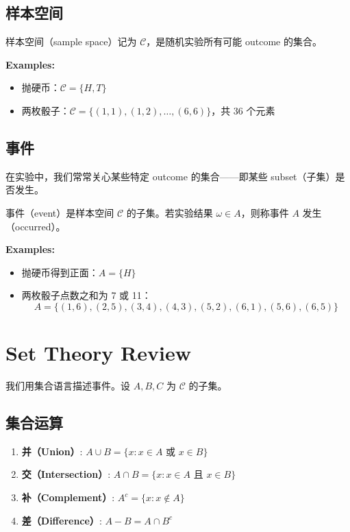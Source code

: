 \subsection{样本空间}\label{sub:sample-space}

\begin{Definition}[样本空间]\label{def:sample-space}
样本空间（sample space）记为 $\mathcal{C}$，是随机实验所有可能 outcome 的集合。
\end{Definition}

\textbf{Examples:}
\begin{itemize}
    \item 抛硬币：$\mathcal{C} = \{H, T\}$
    \item 两枚骰子：$\mathcal{C} = \{(1,1), (1,2), \ldots, (6,6)\}$，共 36 个元素
\end{itemize}

\subsection{事件}\label{sub:event}

在实验中，我们常常关心某些特定 outcome 的集合——即某些 subset（子集）是否发生。

\begin{Definition}[事件]\label{def:event}
事件（event）是样本空间 $\mathcal{C}$ 的子集。若实验结果 $\omega \in A$，则称事件 $A$ 发生（occurred）。
\end{Definition}

\textbf{Examples:}
\begin{itemize}
    \item 抛硬币得到正面：$A = \{H\}$
    \item 两枚骰子点数之和为 7 或 11：
    \[
    A = \{(1,6),(2,5),(3,4),(4,3),(5,2),(6,1),(5,6),(6,5)\}
    \]
\end{itemize}

\section{Set Theory Review}\label{sec:set-theory}

我们用集合语言描述事件。设 $A, B, C$ 为 $\mathcal{C}$ 的子集。

\subsection{集合运算}\label{sub:set-operations}

\begin{enumerate}
    \item \textbf{并（Union）}: $A \cup B = \{x: x \in A \text{ 或 } x \in B\}$
    \item \textbf{交（Intersection）}: $A \cap B = \{x: x \in A \text{ 且 } x \in B\}$
    \item \textbf{补（Complement）}: $A^c = \{x: x \notin A\}$
    \item \textbf{差（Difference）}: $A - B = A \cap B^c$
\end{enumerate}

